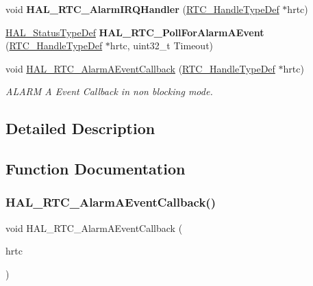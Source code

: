 \begin{DoxyCompactItemize}
\item 
\mbox{\label{group___r_t_c___exported___functions___group3_gac185f2ce34fe566418d0978a48e0c199}} 
void {\bfseries H\+A\+L\+\_\+\+R\+T\+C\+\_\+\+Alarm\+I\+R\+Q\+Handler} (\hyperlink{struct_r_t_c___handle_type_def}{R\+T\+C\+\_\+\+Handle\+Type\+Def} $\ast$hrtc)
\item 
\mbox{\label{group___r_t_c___exported___functions___group3_gaedc27fe412f45d999d74a0b98dce4d09}} 
\hyperlink{stm32f0xx__hal__def_8h_a63c0679d1cb8b8c684fbb0632743478f}{H\+A\+L\+\_\+\+Status\+Type\+Def} {\bfseries H\+A\+L\+\_\+\+R\+T\+C\+\_\+\+Poll\+For\+Alarm\+A\+Event} (\hyperlink{struct_r_t_c___handle_type_def}{R\+T\+C\+\_\+\+Handle\+Type\+Def} $\ast$hrtc, uint32\+\_\+t Timeout)
\item 
void \hyperlink{group___r_t_c___exported___functions___group3_ga11aeff83fd498cddbed3bcddcf017e0a}{H\+A\+L\+\_\+\+R\+T\+C\+\_\+\+Alarm\+A\+Event\+Callback} (\hyperlink{struct_r_t_c___handle_type_def}{R\+T\+C\+\_\+\+Handle\+Type\+Def} $\ast$hrtc)
\begin{DoxyCompactList}\small\item\em A\+L\+A\+RM A Event Callback in non blocking mode. \end{DoxyCompactList}\end{DoxyCompactItemize}


\subsection{Detailed Description}


\subsection{Function Documentation}
\mbox{\label{group___r_t_c___exported___functions___group3_ga11aeff83fd498cddbed3bcddcf017e0a}} 
\subsubsection{\texorpdfstring{H\+A\+L\+\_\+\+R\+T\+C\+\_\+\+Alarm\+A\+Event\+Callback()}{HAL\_RTC\_AlarmAEventCallback()}}
{\footnotesize\ttfamily void H\+A\+L\+\_\+\+R\+T\+C\+\_\+\+Alarm\+A\+Event\+Callback (\begin{DoxyParamCaption}\item[{\hyperlink{struct_r_t_c___handle_type_def}{R\+T\+C\+\_\+\+Handle\+Type\+Def} $\ast$}]{hrtc }\end{DoxyParamCaption})}



